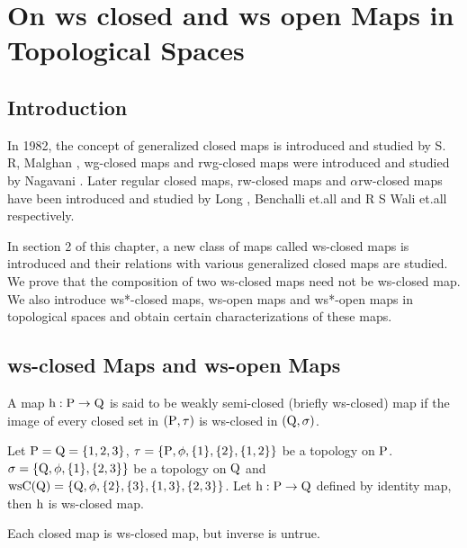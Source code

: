 \chapter{On ws closed and ws open Maps in Topological Spaces}
\graphicspath{{Chapter4/Chapter4Figs/EPS/}{Chapter4/Chapter4Figs/}}

\section{Introduction}\label{sec4.1}

In 1982, the concept of generalized closed maps is introduced and studied by S. R, Malghan \cite{Malghan}, wg-closed maps and rwg-closed maps were introduced and studied by Nagavani \cite{Nagaveni}. Later regular closed maps, rw-closed maps and $\alpha$rw-closed maps have been introduced and studied by Long \cite{Long}, Benchalli et.all \cite{Benchalli} and R S Wali et.all \cite{Wali} respectively. 

In section 2 of this chapter, a new class of maps called ws-closed maps is introduced and their relations with various generalized closed maps are studied. We prove that the composition of two ws-closed maps need not be ws-closed map. We also introduce ws*-closed maps, ws-open maps and ws*-open maps in topological spaces and obtain certain characterizations of these maps.

\section{ws-closed Maps and ws-open Maps}\label{sec4.2}

\begin{dfn}\label{defi4.2.1} 
A map $\mathrm{h}: \mathrm{P} \to \mathrm{Q}$ is said to be weakly semi-closed (briefly ws-closed) map if the image of every closed set in $(\mathrm{P}, \tau)$ is ws-closed in $(\mathrm{Q}, \sigma)$.
\end{dfn}

\begin{exm}\label{exam4.2.2}
Let $\mathrm{P} = \mathrm{Q} = \{1, 2, 3\}$, $\tau = \{\mathrm{P}, \phi, \{1\}, \{2\}, \{1, 2\}\}$ be a topology on $\mathrm{P}$.
$\sigma = \{\mathrm{Q}, \phi, \{1\}, \{2, 3\}\}$ be a topology on $\mathrm{Q}$ and $\ws\TSC(\TSQ) =\{\TSQ, \phi, \{2\},\{3\},\{1,3\},\break \{2, 3\}\}$. Let $\mathrm{h}: \mathrm{P} \to \mathrm{Q}$ defined by identity map, then $\mathrm{h}$ is ws-closed map.
\end{exm}

\begin{thm}\label{thm4.2.3}
Each closed map is ws-closed map, but inverse is untrue.
\end{thm}

